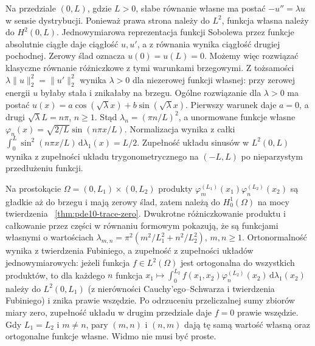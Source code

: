\begin{przyklad}
Na przedziale $(0,L)$, gdzie $L>0$, słabe równanie
własne ma postać $-u''=\lambda u$ w sensie dystrybucji.
Ponieważ prawa strona należy do $L^2$, funkcja własna
należy do $H^2(0,L)$. Jednowymiarowa reprezentacja
funkcji Sobolewa przez funkcje absolutnie ciągłe daje
ciągłość $u,u'$, a z równania wynika ciągłość drugiej
pochodnej. Zerowy ślad oznacza $u(0)=u(L)=0$.
Możemy więc rozwiązać klasyczne równanie różniczkowe
z tymi warunkami brzegowymi.
Z tożsamości $\lambda\|u\|_2^2=\|u'\|_2^2$ wynika
$\lambda>0$ dla niezerowej funkcji własnej:
przy zerowej energii $u$ byłaby stała i znikałaby na brzegu.
Ogólne rozwiązanie dla $\lambda>0$ ma postać
$u(x)=a\cos(\sqrt\lambda x)+b\sin(\sqrt\lambda x)$.
Pierwszy warunek daje $a=0$, a drugi
$\sqrt\lambda L=n\pi$, $n\ge1$. Stąd
$\lambda_n=(\pi n/L)^2$, a unormowane funkcje własne
$\varphi_n(x)=\sqrt{2/L}\sin(n\pi x/L)$.
Normalizacja wynika z całki $\int_0^L\sin^2(n\pi x/L)
\,\mathrm d\lambda_1(x)=L/2$. Zupełność układu sinusów w $L^2(0,L)$
wynika z zupełności układu trygonometrycznego na $(-L,L)$
po nieparzystym przedłużeniu funkcji.

Na prostokącie $\Omega=(0,L_1)\times(0,L_2)$ produkty
$\varphi_m^{(L_1)}(x_1)\varphi_n^{(L_2)}(x_2)$
są gładkie aż do brzegu i mają zerowy ślad, zatem
należą do $H_0^1(\Omega)$ na mocy twierdzenia
~\ref{thm:pde10-trace-zero}. Dwukrotne różniczkowanie
produktu i całkowanie przez części w równaniu formowym
pokazują, że są funkcjami własnymi
o wartościach $\lambda_{m,n}=\pi^2(m^2/L_1^2+n^2/L_2^2)$,
$m,n\ge1$. Ortonormalność wynika z twierdzenia Fubiniego,
a zupełność z zupełności układów jednowymiarowych:
jeżeli funkcja $f\in L^2(\Omega)$ jest ortogonalna do
wszystkich produktów, to dla każdego $n$ funkcja
$x_1\mapsto\int_0^{L_2}f(x_1,x_2)\varphi_n^{(L_2)}(x_2)
\,\mathrm d\lambda_1(x_2)$ należy do $L^2(0,L_1)$
(z nierówności Cauchy'ego--Schwarza i twierdzenia Fubiniego) i znika
prawie wszędzie. Po odrzuceniu przeliczalnej sumy
zbiorów miary zero, zupełność układu w drugim przedziale
daje $f=0$ prawie wszędzie. Gdy $L_1=L_2$ i $m\ne n$,
pary $(m,n)$ i $(n,m)$ dają tę samą wartość własną
oraz ortogonalne funkcje własne. Widmo nie musi być proste.
\end{przyklad}


